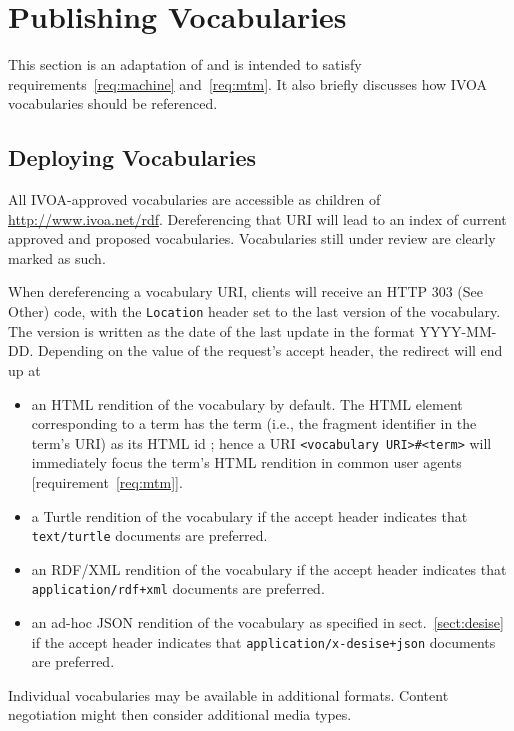 \documentclass[11pt,a4paper]{ivoa}
\begin{document}
\section{Publishing Vocabularies}
\label{sect:deployment}

This section is an adaptation of \citet{note:cooluris} and is
intended to satisfy requirements~\ref{req:machine}
and~\ref{req:mtm}.  It also briefly discusses how IVOA vocabularies
should be referenced.

\subsection{Deploying Vocabularies}

All IVOA-approved vocabularies are accessible as children of
\url{http://www.ivoa.net/rdf}.  Dereferencing that URI will lead to an
index of current approved and proposed vocabularies.
Vocabularies still under review are clearly marked as such.

When dereferencing a vocabulary URI, clients will receive an HTTP 303
(See Other) code, with the \texttt{Location} header set to the last
version of the vocabulary.  The version is written as the date of the
last update in the format YYYY-MM-DD.  Depending on the value of the
request's accept header, the redirect will end up at

\begin{itemize}
\item an HTML rendition of the vocabulary by default.  The HTML element
corresponding to a term has the term (i.e., the fragment identifier in the
term's URI) as its HTML id ; hence a URI
\verb|<vocabulary URI>#<term>| will immediately focus the term's HTML
rendition in common
user agents [requirement~\ref{req:mtm}].

\item a Turtle rendition of the vocabulary if the accept header
indicates that \verb|text/turtle| documents are preferred.

\item an RDF/XML rendition of the vocabulary
if the accept header indicates that
\verb|application/rdf+xml| documents are preferred. 

\item an ad-hoc JSON rendition of the vocabulary as specified in
sect.~\ref{sect:desise} if the accept header indicates that
\verb|application/x-desise+json| documents are preferred.
\end{itemize}

Individual vocabularies may be available in additional formats.
Content negotiation might then consider additional media types.
\end{document}
